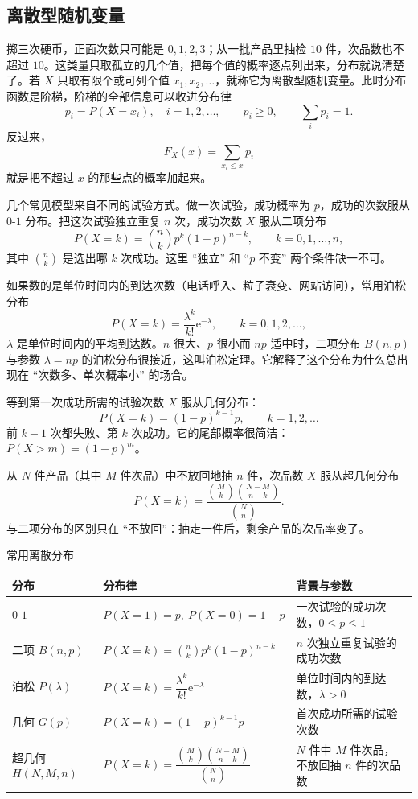 \subsection{离散型随机变量}

掷三次硬币，正面次数只可能是 $0,1,2,3$；从一批产品里抽检 $10$ 件，次品数也不超过 $10$。这类量只取孤立的几个值，把每个值的概率逐点列出来，分布就说清楚了。若 $X$ 只取有限个或可列个值 $x_1,x_2,\dots$，就称它为离散型随机变量。此时分布函数是阶梯，阶梯的全部信息可以收进分布律
\[
p_i=P(X=x_i),\quad i=1,2,\dots,\qquad p_i\ge0,\qquad \sum_i p_i=1 .
\]
反过来，
\[
F_X(x)=\sum_{x_i\le x}p_i
\]
就是把不超过 $x$ 的那些点的概率加起来。

几个常见模型来自不同的试验方式。做一次试验，成功概率为 $p$，成功的次数服从 $0$-$1$ 分布。把这次试验独立重复 $n$ 次，成功次数 $X$ 服从二项分布
\[
P(X=k)=\binom{n}{k}p^k(1-p)^{n-k},\qquad k=0,1,\dots,n,
\]
其中 $\binom{n}{k}$ 是选出哪 $k$ 次成功。这里 ``独立'' 和 ``$p$ 不变'' 两个条件缺一不可。

如果数的是单位时间内的到达次数（电话呼入、粒子衰变、网站访问），常用泊松分布
\[
P(X=k)=\frac{\lambda^k}{k!}\mathrm{e}^{-\lambda},\qquad k=0,1,2,\dots,
\]
$\lambda$ 是单位时间内的平均到达数。$n$ 很大、$p$ 很小而 $np$ 适中时，二项分布 $B(n,p)$ 与参数 $\lambda=np$ 的泊松分布很接近，这叫泊松定理。它解释了这个分布为什么总出现在 ``次数多、单次概率小'' 的场合。

等到第一次成功所需的试验次数 $X$ 服从几何分布：
\[
P(X=k)=(1-p)^{k-1}p,\qquad k=1,2,\dots
\]
前 $k-1$ 次都失败、第 $k$ 次成功。它的尾部概率很简洁：$P(X>m)=(1-p)^m$。

从 $N$ 件产品（其中 $M$ 件次品）中不放回地抽 $n$ 件，次品数 $X$ 服从超几何分布
\[
P(X=k)=\frac{\binom{M}{k}\binom{N-M}{n-k}}{\binom{N}{n}} .
\]
与二项分布的区别只在 ``不放回''：抽走一件后，剩余产品的次品率变了。

\begin{tablebox}{常用离散分布}
\centering
\small
\renewcommand{\arraystretch}{1.5}
\begin{tabular}{@{}p{3.3cm}p{5.5cm}p{5.3cm}@{}}
\toprule
分布 & 分布律 & 背景与参数 \\
\midrule
$0$-$1$ & $P(X=1)=p,\ P(X=0)=1-p$ & 一次试验的成功次数，$0\le p\le1$ \\
二项 $B(n,p)$ & $P(X=k)=\binom{n}{k}p^k(1-p)^{n-k}$ & $n$ 次独立重复试验的成功次数 \\
泊松 $P(\lambda)$ & $P(X=k)=\dfrac{\lambda^k}{k!}\mathrm{e}^{-\lambda}$ & 单位时间内的到达数，$\lambda>0$ \\
几何 $G(p)$ & $P(X=k)=(1-p)^{k-1}p$ & 首次成功所需的试验次数 \\
超几何 $H(N,M,n)$ & $P(X=k)=\dfrac{\binom{M}{k}\binom{N-M}{n-k}}{\binom{N}{n}}$ & $N$ 件中 $M$ 件次品，不放回抽 $n$ 件的次品数 \\
\bottomrule
\end{tabular}
\end{tablebox}

